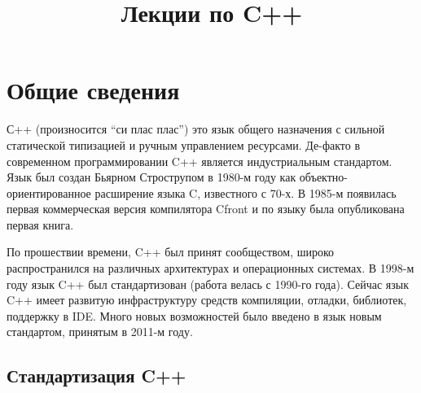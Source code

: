 \documentclass[a4paper,12pt,oneside]{article}
\begin{document}
\title{Лекции по C++}

\tableofcontents


\pagebreak
\section{Общие сведения}

С++ (произносится ``си плас плас'') это язык общего назначения с сильной статической типизацией и ручным управлением ресурсами. Де-факто в современном программировании C++ является индустриальным стандартом. Язык был создан Бьярном Строструпом в 1980-м году как объектно-ориентированное расширение языка C, известного с 70-х. В 1985-м появилась первая коммерческая версия компилятора Cfront и по языку была опубликована первая книга. 

По прошествии времени, C++ был принят сообществом, широко распространился на различных архитектурах и операционных системах. В 1998-м году язык C++ был стандартизован (работа велась с 1990-го года). Сейчас язык C++ имеет развитую инфраструктуру средств компиляции, отладки, библиотек, поддержку в IDE. Много новых возможностей было введено в язык новым стандартом, принятым в 2011-м году.

\subsection{Стандартизация C++}
\end{document}
